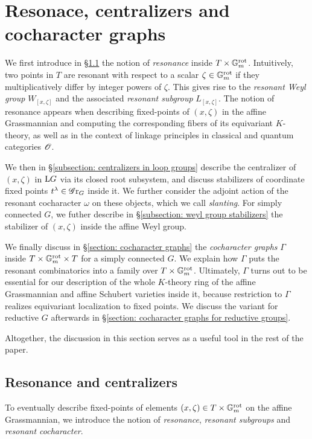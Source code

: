 \section{Resonace, centralizers and cocharacter graphs}\label{section: cocharacter graphs and resonance}

We first introduce in \S \ref{section: resonance} the notion of \textit{resonance} inside $T \times \mathbb{G}_m^{\mathrm{rot}}$. Intuitively, two points in $T$ are resonant with respect to a scalar $\zeta \in \mathbb{G}_m^{\mathrm{rot}}$ if they multiplicatively differ by integer powers of $\zeta$. This gives rise to the \textit{resonant Weyl group} $W_{[x, \zeta]}$ and the associated \textit{resonant subgroup} $L_{[x, \zeta]}$. 
The notion of resonance appears when describing fixed-points of $(x, \zeta)$ in the affine Grassmannian and computing the corresponding fibers of its equivariant $K$-theory, as well as in the context of linkage principles in classical and quantum categories $\operatorname{\mathscr{O}}$.

We then in \S \ref{subsection: centralizers in loop groups} describe the centralizer of $(x, \zeta)$ in $\mathrm{L} G$ via its closed root subsystem, and discuss stabilizers of coordinate fixed points $t^{\lambda} \in \operatorname{\mathscr{G}r}_G$ inside it. We further consider the adjoint action of the resonant cocharacter $\omega$ on these objects, which we call \emph{slanting}. 
%
For simply connected $G$, we futher describe in \S \ref{subsection: weyl group stabilizers} the stabilizer of $(x, \zeta)$ inside the affine Weyl group.

We finally discuss in \S \ref{section: cocharacter graphs} the \textit{cocharacter graphs} $\Gamma$ inside $T \times \mathbb{G}_m^{\mathrm{rot}} \times T$ for a simply connected $G$. We explain how $\Gamma$ puts the resonant combinatorics into a family over $T \times \mathbb{G}_m^{\mathrm{rot}}$. Ultimately, $\Gamma$ turns out to be essential for our description of the whole $K$-theory ring of the affine Grassmannian and affine Schubert varieties inside it, because restriction to $\Gamma$ realizes equivariant localization to fixed points. We discuss the variant for reductive $G$ afterwards in \S \ref{section: cocharacter graphs for reductive groups}.

Altogether, the discussion in this section serves as a useful tool in the rest of the paper.








\subsection{Resonance and centralizers}\label{section: resonance}
To eventually describe fixed-points of elements $(x, \zeta) \in T \times \mathbb{G}_m^{\mathrm{rot}}$ on the affine Grassmannian, we introduce the notion of \emph{resonance}, \emph{resonant subgroups} and \emph{resonant cocharacter}.

